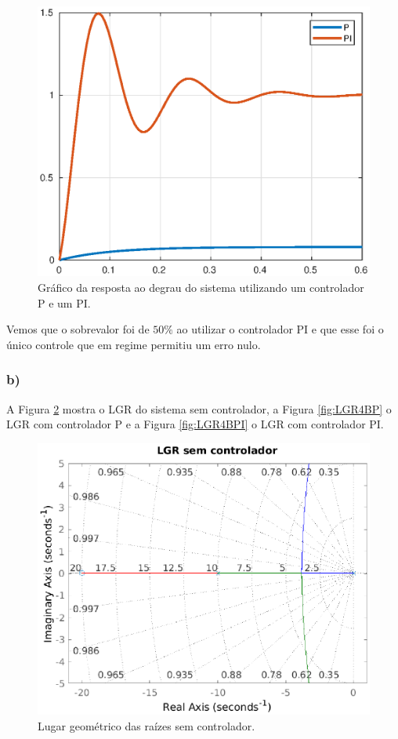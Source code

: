 \begin{figure}[!ht]
    \centering
    \includegraphics[width = 0.75\linewidth]{Figuras/ProblemasPI/Problema4/step.eps}
    \caption{Gráfico da resposta ao degrau do sistema utilizando um controlador P e um PI.}
    \label{fig:Q4A}                   
\end{figure}

Vemos que o sobrevalor foi de $50\%$ ao utilizar o controlador PI e que esse foi o único controle que em regime permitiu
um erro nulo.

\subsubsection*{b)}

    A Figura \ref{fig:LGR4Bsem} mostra o LGR do sistema sem controlador, a Figura \ref{fig:LGR4BP} o 
    LGR com controlador P e a Figura \ref{fig:LGR4BPI}  o LGR com controlador PI. 


    \begin{figure}[!ht]
        \centering
        \includegraphics[width = 0.75\linewidth]{Figuras/ProblemasPI/Problema3/LGRsemControlador.eps}
        \caption{Lugar geométrico das raízes sem controlador.}
        \label{fig:LGR4Bsem}                   
    \end{figure}


